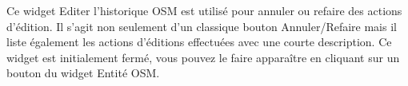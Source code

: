 
Ce widget Editer l'historique OSM est utilisé pour annuler ou refaire des actions d'édition. Il s'agit non seulement d'un classique bouton Annuler/Refaire mais il liste également les actions d'éditions effectuées avec une courte description. Ce widget est initialement fermé, vous pouvez le faire apparaître en cliquant sur un bouton du widget Entité OSM.


